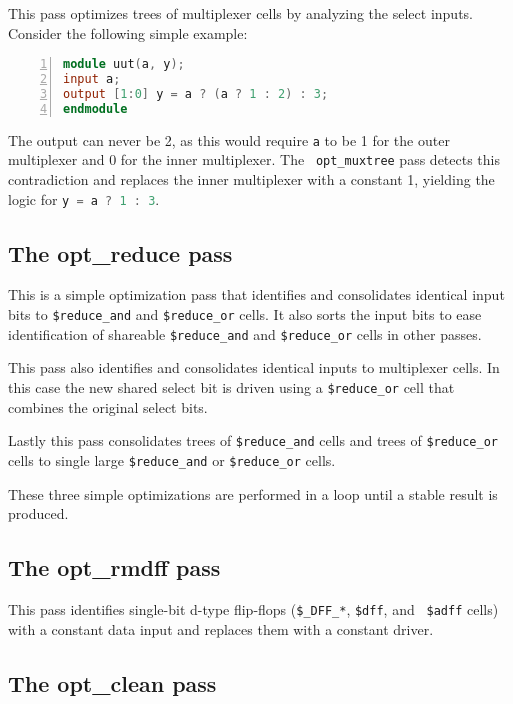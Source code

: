 This pass optimizes trees of multiplexer cells by analyzing the select inputs.
Consider the following simple example:

\begin{lstlisting}[numbers=left,frame=single,language=Verilog]
module uut(a, y);
input a;
output [1:0] y = a ? (a ? 1 : 2) : 3;
endmodule
\end{lstlisting}

The output can never be 2, as this would require \lstinline[language=Verilog];a;
to be 1 for the outer multiplexer and 0 for the inner multiplexer. The {\tt
opt\_muxtree} pass detects this contradiction and replaces the inner multiplexer
with a constant 1, yielding the logic for \lstinline[language=Verilog];y = a ? 1 : 3;.

\subsection{The opt\_reduce pass}

\begin{sloppypar}
This is a simple optimization pass that identifies and consolidates identical input
bits to {\tt \$reduce\_and} and {\tt \$reduce\_or} cells. It also sorts the input
bits to ease identification of shareable {\tt \$reduce\_and} and {\tt \$reduce\_or} cells
in other passes.
\end{sloppypar}

This pass also identifies and consolidates identical inputs to multiplexer cells. In this
case the new shared select bit is driven using a {\tt \$reduce\_or} cell that combines
the original select bits.

Lastly this pass consolidates trees of {\tt \$reduce\_and} cells and trees of
{\tt \$reduce\_or} cells to single large {\tt \$reduce\_and} or {\tt \$reduce\_or} cells.

These three simple optimizations are performed in a loop until a stable result is
produced.

\subsection{The opt\_rmdff pass}

This pass identifies single-bit d-type flip-flops ({\tt \$\_DFF\_*}, {\tt \$dff}, and {\tt
\$adff} cells) with a constant data input and replaces them with a constant driver.

\subsection{The opt\_clean pass}


